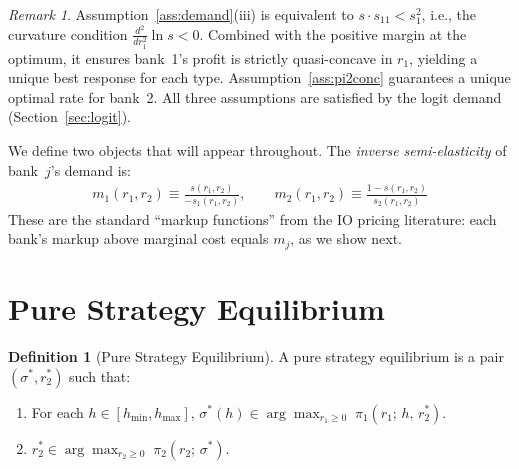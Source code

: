 \documentclass[12pt]{article}
\theoremstyle{plain}
\theoremstyle{plain}
\theoremstyle{definition}  %
\newtheorem{definition}[thm]{Definition}  %
\theoremstyle{remark}  %
\newtheorem{remark}[thm]{Remark}  %
\begin{document}
\begin{remark}
Assumption~\ref{ass:demand}(iii) is equivalent to $s \cdot s_{11} < s_1^2$, i.e., the curvature condition $\frac{d^2}{dr_1^2}\ln s < 0$. Combined with the positive margin at the optimum, it ensures bank~1's profit is strictly quasi-concave in $r_1$, yielding a unique best response for each type. Assumption~\ref{ass:pi2conc} guarantees a unique optimal rate for bank~2. All three assumptions are satisfied by the logit demand (Section~\ref{sec:logit}).
\end{remark}

We define two objects that will appear throughout. The \emph{inverse semi-elasticity} of bank~$j$'s demand is:
\begin{align}\label{eq:markup_def}
    m_1(r_1, r_2) \equiv \frac{s(r_1, r_2)}{-s_1(r_1, r_2)}, \qquad m_2(r_1, r_2) \equiv \frac{1 - s(r_1, r_2)}{s_2(r_1, r_2)}
\end{align}
These are the standard ``markup functions'' from the IO pricing literature: each bank's markup above marginal cost equals $m_j$, as we show next.



\section{Pure Strategy Equilibrium}\label{sec:eq}

\begin{definition}[Pure Strategy Equilibrium]
A pure strategy equilibrium is a pair $(\sigma^*, r_2^*)$ such that:
\begin{enumerate}
    \item For each $h \in [h_{\min}, h_{\max}]$, \; $\sigma^*(h) \in \displaystyle\arg\max_{r_1 \geq 0} \; \pi_1(r_1;\, h,\, r_2^*)$.
    \item $r_2^*  \in \displaystyle\arg\max_{r_2 \geq 0} \; \pi_2(r_2;\, \sigma^*)$.
\end{enumerate}
\end{definition}
\end{document}
